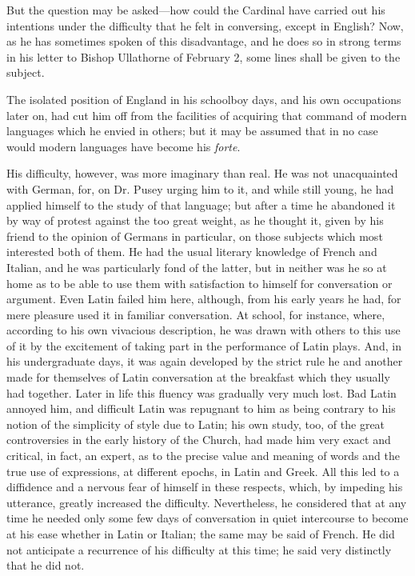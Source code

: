 But the question may be asked—how could the Cardinal have carried
out his intentions under the difficulty that he felt in conversing,
except in English? Now, as he has sometimes spoken of this
disadvantage, and he does so in strong terms in his letter to Bishop
Ullathorne of February 2, some lines shall be given to the subject.

The isolated position of England in his schoolboy days, and his own
occupations later on, had cut him off from the facilities of acquiring
that command of modern languages which he envied in others; but it may
be assumed that in no case would modern languages have become his \emph{forte}.

His difficulty, however, was more imaginary than real. He was not
unacquainted with German, for, on Dr. Pusey urging him to it, and
while still young, he had applied himself to the study of that
language; but after a time he abandoned it by way of protest against
the too great weight, as he thought it, given by his friend to the
opinion of Germans in particular, on those subjects which most
interested both of them. He had the usual literary knowledge of French
and Italian, and he was particularly fond of the latter, but in
neither was he so at home as to be able to use them with satisfaction
to himself for conversation or argument. Even Latin failed him here,
although, from his early years he had, for mere pleasure used it in
familiar conversation. At school, for instance, where, according to
his own vivacious description, he was drawn with others to this use of
it by the excitement of taking part in the performance of Latin plays.
And, in his undergraduate days, it was again developed by the strict
rule he and another made for themselves of Latin conversation at the
breakfast which they usually had together. Later in life this fluency
was gradually very much lost. Bad Latin annoyed him, and difficult
Latin was repugnant to him as being contrary to his notion of the
simplicity of style due to Latin; his own study, too, of the great
controversies in the early history of the Church, had made him
very exact and critical, in fact, an expert, as to the precise value
and meaning of words and the true use of expressions, at different
epochs, in Latin and Greek. All this led to a diffidence and a nervous
fear of himself in these respects, which, by impeding his utterance,
greatly increased the difficulty. Nevertheless, he considered that at
any time he needed only some few days of conversation in quiet
intercourse to become at his ease whether in Latin or Italian; the
same may be said of French. He did not anticipate a recurrence of his
difficulty at this time; he said very distinctly that he did not.

